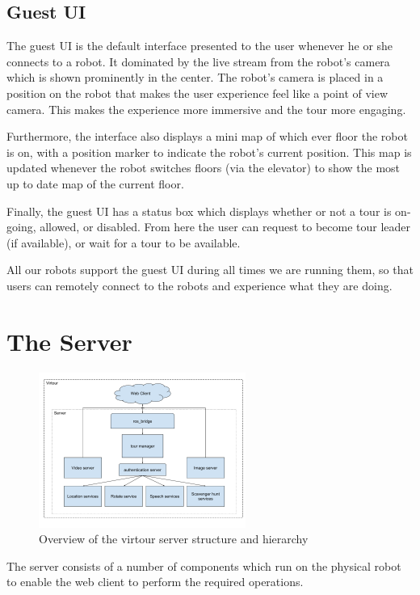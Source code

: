 \documentclass{sig-alternate-05-2015}
\begin{document}
\subsection{Guest UI}

The guest UI is the default interface presented to the user whenever he or she
connects to a robot. It dominated by the live stream from the robot's camera
which is shown prominently in the center. The robot's camera is placed in a
position on the robot that makes the user experience feel like a point of view
camera. This makes the experience more immersive and the tour more engaging.

Furthermore, the interface also displays a mini map of which ever floor the
robot is on, with a position marker to indicate the robot's current position.
This map is updated whenever the robot switches floors (via the elevator) to
show the most up to date map of the current floor.

Finally, the guest UI has a status box which displays whether or not a tour is
on-going, allowed, or disabled. From here the user can request to become tour
leader (if available), or wait for a tour to be available.

All our robots support the guest UI during all times we are running them, so
that users can remotely connect to the robots and experience what they are
doing.

\section{The Server}

\begin{figure}
\centering
\includegraphics[height=2in]{virtour_server}
\caption{Overview of the virtour server structure and hierarchy}
\end{figure}

The server consists of a number of components which run on the physical robot
to enable the web client to perform the required operations.
\end{document}
